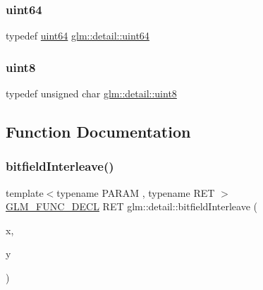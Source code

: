\mbox{\label{namespaceglm_1_1detail_adec4b19bf4982125e122db2fe03c5810}} 
\subsubsection{\texorpdfstring{uint64}{uint64}}
{\footnotesize\ttfamily typedef \mbox{\hyperlink{namespaceglm_1_1detail_adec4b19bf4982125e122db2fe03c5810}{uint64}} \mbox{\hyperlink{namespaceglm_1_1detail_adec4b19bf4982125e122db2fe03c5810}{glm\+::detail\+::uint64}}}

\mbox{\label{namespaceglm_1_1detail_aef2588f97d090cc19fbbe0c74fe17c8f}} 
\subsubsection{\texorpdfstring{uint8}{uint8}}
{\footnotesize\ttfamily typedef unsigned char \mbox{\hyperlink{namespaceglm_1_1detail_aef2588f97d090cc19fbbe0c74fe17c8f}{glm\+::detail\+::uint8}}}



\subsection{Function Documentation}
\mbox{\label{namespaceglm_1_1detail_a39644ee418ae41e3393d1cb6191e32a7}} 
\subsubsection{\texorpdfstring{bitfield\+Interleave()}{bitfieldInterleave()}\hspace{0.1cm}{\footnotesize\ttfamily [1/11]}}
{\footnotesize\ttfamily template$<$typename P\+A\+R\+AM , typename R\+ET $>$ \\
\mbox{\hyperlink{setup_8hpp_ab2d052de21a70539923e9bcbf6e83a51}{G\+L\+M\+\_\+\+F\+U\+N\+C\+\_\+\+D\+E\+CL}} R\+ET glm\+::detail\+::bitfield\+Interleave (\begin{DoxyParamCaption}\item[{P\+A\+R\+AM}]{x,  }\item[{P\+A\+R\+AM}]{y }\end{DoxyParamCaption})}


